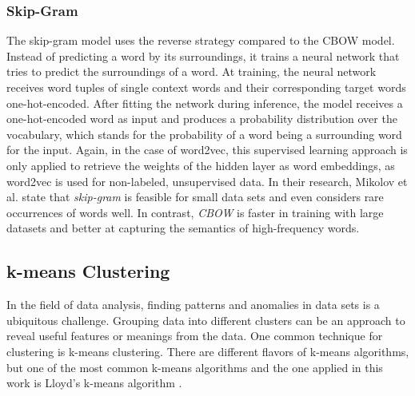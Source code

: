 \documentclass[
    fontsize=12pt,
    headings=small,
    parskip=half,           %
    bibliography=totoc,
    numbers=noenddot,       %
    open=any,               %
    ]{scrreprt}
\begin{document}
\subsubsection{Skip-Gram}
The skip-gram model uses the reverse strategy compared to the CBOW model. Instead of predicting a word by its surroundings, it trains a neural network that tries to predict the surroundings of a word. At training, the neural network receives word tuples of single context words and their corresponding target words one-hot-encoded. After fitting the network during inference, the model receives a one-hot-encoded word as input and produces a probability distribution over the vocabulary, which stands for the probability of a word being a surrounding word for the input. Again, in the case of word2vec, this supervised learning approach is only applied to retrieve the weights of the hidden layer as word embeddings, as word2vec is used for non-labeled, unsupervised data. In their research, Mikolov et al. state that \emph{skip-gram} is feasible for small data sets and even considers rare occurrences of words well. In contrast, \emph{CBOW} is faster in training with large datasets and better at capturing the semantics of high-frequency words. 

\subsection{k-means Clustering}
In the field of data analysis, finding patterns and anomalies in data sets is a ubiquitous challenge. Grouping data into different clusters can be an approach to reveal useful features or meanings from the data. One common technique for clustering is k-means clustering. There are different flavors of k-means algorithms, but one of the most common k-means algorithms and the one applied in this work is Lloyd's k-means algorithm \cite{wilkin2007kmeans}. 
\end{document}
